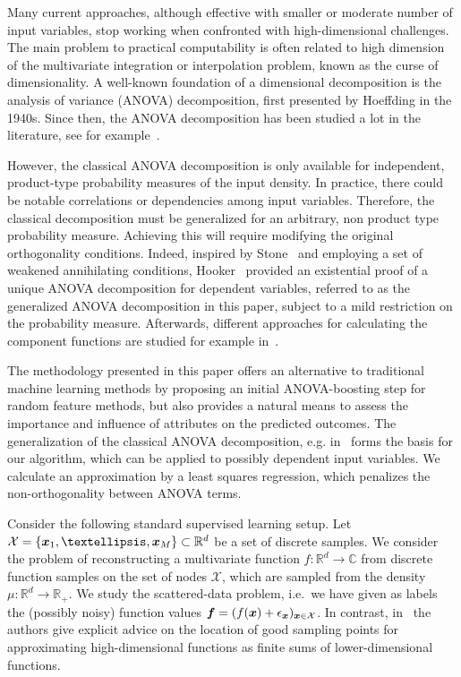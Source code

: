\documentclass{article}
\renewcommand{\vec}[1]{\ensuremath \mathbf{\boldsymbol{#1}}}
\newcommand{\X}{\ensuremath{\mathcal{X}}}
\newcommand{\x}{\ensuremath{\vec x}}
\newcommand{\R}{\ensuremath{\mathbb{R}}}
\newcommand{\C}{\ensuremath{\mathbb{C}}}
\theoremstyle{definition}
\numberwithin{equation}{section}
\begin{document}
Many current approaches, although effective with smaller or moderate number of input variables, stop working when confronted with high-dimensional challenges. The main problem to practical computability is often related to high dimension of the multivariate integration or interpolation
problem, known as the curse of dimensionality. A well-known foundation of a dimensional decomposition is the analysis of variance (ANOVA) decomposition, first presented by Hoeffding in the 1940s. Since then, the ANOVA decomposition has been studied a lot in the literature, see for example~\cite{CaMoOw97, RaAl99, LiOw06, KuSlWaWo09, Holtz11, Gu13, Owen23}. \par
However, the
classical ANOVA decomposition is only available for
independent, product-type probability measures of the input density. 
In practice, there could be notable correlations or dependencies among input variables. Therefore, the classical decomposition must be generalized for an arbitrary,
non product type probability measure. Achieving this will require modifying the original
orthogonality conditions. Indeed, inspired by Stone~\cite{St94} and employing a set
of weakened annihilating conditions, Hooker~\cite{Ho07} provided an existential proof of a
unique ANOVA decomposition for dependent variables, referred to as the generalized ANOVA decomposition in this paper, subject to a mild restriction on the probability measure. Afterwards, different approaches for calculating the component functions are studied for example in~\cite{LiRa12, Ra142}. \par




The methodology presented in this paper offers an alternative to traditional machine learning methods by proposing an initial ANOVA-boosting step for random feature methods, but also provides a natural means to assess the importance and influence of attributes on the predicted outcomes. The generalization of the classical ANOVA decomposition, e.g. in~\cite{Ho07, Ra142} forms the basis for our algorithm, which can be applied to possibly dependent input variables. We calculate an approximation by a least squares regression, which  penalizes the non-orthogonality between ANOVA terms. \par




Consider the following standard supervised learning setup. Let $\X=\{\vec x_1,\ldots,\vec x_M\}\subset\R^d$ be a set of discrete samples. We consider the problem of reconstructing a multivariate function $f\colon\R^d \rightarrow \C$ from discrete function samples on the set of nodes $\X$, which are sampled from the density $\mu\colon \R^d\rightarrow \R_{+}$.
We study the scattered-data problem, i.e.~we have given as labels the (possibly noisy) function values $\vec f = (f(\vec x) + \epsilon_{\x} )_{\vec x\in \X}$.
In contrast, in~\cite{RiWe24} the authors give explicit advice on the location of good sampling points for approximating high-dimensional functions as finite sums of lower-dimensional functions.\par
\end{document}
